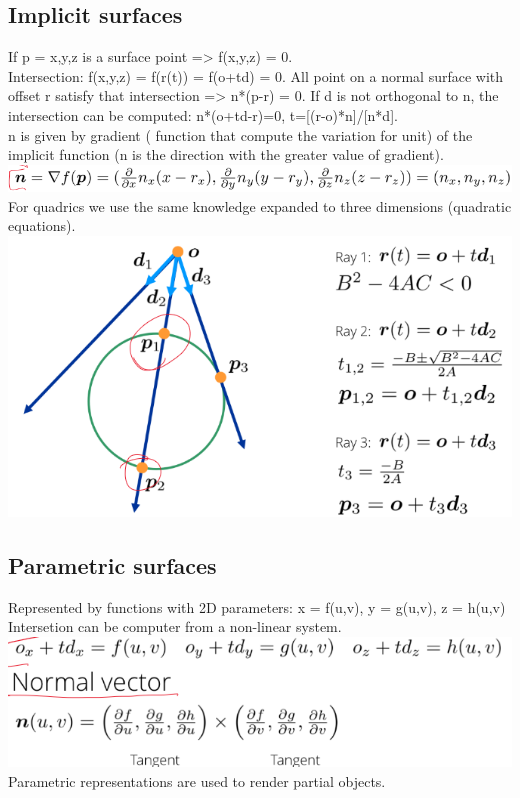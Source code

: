 \documentclass{article}
\begin{document}
\subsection{Implicit surfaces}
If p = x,y,z is a surface point => f(x,y,z) = 0.\\
Intersection: f(x,y,z) = f(r(t)) = f(o+td) = 0. All point on a normal surface with offset r satisfy that intersection => n*(p-r) = 0. If d is not orthogonal to n, the intersection can be computed: n*(o+td-r)=0, t=[(r-o)*n]/[n*d].\\
n is given by gradient ( function that compute the variation for unit) of the implicit function (n is the direction with the greater value of gradient).\\
\includegraphics{image7.png}
For quadrics we use the same knowledge expanded to three dimensions (quadratic equations).\\
\includegraphics{image8.png}
\subsection{Parametric surfaces}
Represented by functions with 2D parameters: x = f(u,v), y = g(u,v), z = h(u,v)\\
Intersetion can be computer from a non-linear system.\\
\includegraphics{image9.png}
Parametric representations are used to render partial objects.
\end{document}
